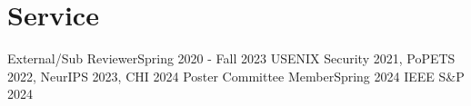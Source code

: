 \section{Service}
\CVSubHeadingListStart
    \CVSubheading
      {External/Sub Reviewer}{Spring 2020 - Fall 2023}
      {USENIX Security 2021, PoPETS 2022, NeurIPS 2023, CHI 2024}{}
    \CVSubheading
    {Poster Committee Member}{Spring 2024}
      {IEEE S\&P 2024}{}
  \CVSubHeadingListEnd